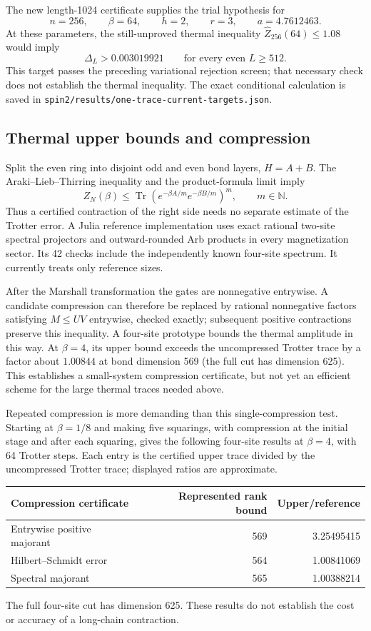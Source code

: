 \documentclass[11pt]{article}
\newcommand{\Tr}{\operatorname{Tr}}
\begin{document}
The new length-1024 certificate supplies the trial hypothesis for
\[
 n=256,\qquad\beta=64,\qquad h=2,\qquad r=3,
 \qquad a=4.7612463.
\]
At these parameters, the still-unproved thermal inequality
$\widehat Z_{256}(64)\le1.08$ would imply
\[
 \Delta_L>0.003019921\qquad\text{for every even }L\ge512.
\]
This target passes the preceding variational rejection screen; that necessary
check does not establish the thermal inequality. The exact conditional
calculation is saved in \texttt{spin2/results/one-trace-current-targets.json}.

\subsection{Thermal upper bounds and compression}
Split the even ring into disjoint odd and even bond layers, $H=A+B$.
The Araki--Lieb--Thirring inequality and the product-formula limit imply
\[
 Z_N(\beta)\le
 \Tr\left(e^{-\beta A/m}e^{-\beta B/m}\right)^m,
 \qquad m\in\mathbb N.
\]
Thus a certified contraction of the right side needs no separate estimate
of the Trotter error. A Julia reference implementation uses exact rational
two-site spectral projectors and outward-rounded Arb products in every
magnetization sector. Its 42 checks include the independently known
four-site spectrum. It currently treats only reference sizes.

After the Marshall transformation the gates are nonnegative entrywise.
A candidate compression can therefore be replaced by rational nonnegative
factors satisfying $M\le UV$ entrywise, checked exactly; subsequent positive
contractions preserve this inequality. A four-site prototype bounds the
thermal amplitude in this way. At $\beta=4$, its upper bound exceeds the
uncompressed Trotter trace by a factor about $1.00844$ at bond dimension 569
(the full cut has dimension 625). This establishes a small-system compression
certificate, but not yet an efficient scheme for the large thermal traces
needed above.

Repeated compression is more demanding than this single-compression test.
Starting at $\beta=1/8$ and making five squarings, with compression at the
initial stage and after each squaring, gives the following four-site results
at $\beta=4$, with 64 Trotter steps. Each entry is the certified upper trace
divided by the uncompressed Trotter trace; displayed ratios are approximate.
\begin{center}
\begin{tabular}{lrr}
\toprule
Compression certificate & Represented rank bound & Upper/reference\\
\midrule
Entrywise positive majorant & 569 & 3.25495415\\
Hilbert--Schmidt error & 564 & 1.00841069\\
Spectral majorant & 565 & 1.00388214\\
\bottomrule
\end{tabular}
\end{center}
The full four-site cut has dimension 625. These results do not establish
the cost or accuracy of a long-chain contraction.
\end{document}

